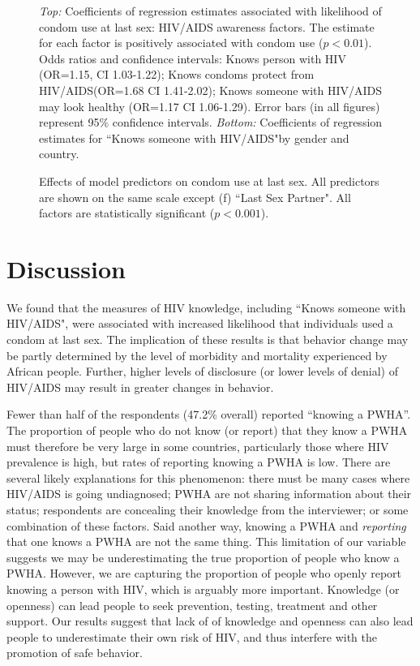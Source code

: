 \documentclass[10pt,letterpaper]{article}
\newcommand{\KnowsPWHA}{``Knows someone with HIV/AIDS"}
\begin{document}
\begin{figure}[!hbt]
\caption{\emph{Top:} Coefficients of regression estimates associated with likelihood of condom use at last sex: HIV/AIDS awareness factors. The estimate for each factor is positively associated with condom use ($p<0.01$). Odds ratios and confidence intervals: Knows person with HIV (OR=1.15, CI 1.03-1.22); Knows condoms protect from HIV/AIDS(OR=1.68 CI 1.41-2.02); Knows someone with HIV/AIDS may look healthy (OR=1.17 CI 1.06-1.29). Error bars (in all figures) represent 95\% confidence intervals. \emph{Bottom:} Coefficients of regression estimates for \KnowsPWHA by gender and country.
}
\label{combined_coefplot.fig}
\end{figure}
%
%
\begin{figure}[!hbt]
\caption{Effects of model predictors on condom use at last sex. All predictors are shown on the same scale except (f) ``Last Sex Partner". All factors are statistically significant ($p <0.001$).}
\label{panel_plot.fig}
\end{figure}


\section{Discussion}

We found that the measures of HIV knowledge, including \KnowsPWHA, were associated with increased likelihood that individuals used a condom at last sex.  The implication of these results is that behavior change may be partly determined by the level of morbidity and mortality experienced by African people. Further, higher levels of disclosure (or lower levels of denial) of HIV/AIDS may result in greater changes in behavior.

Fewer than half of the respondents (47.2\% overall) reported ``knowing a PWHA''. The proportion of people who do not know (or report) that they know a PWHA must therefore be very large in some countries, particularly those where HIV prevalence is high, but rates of reporting knowing a PWHA is low. There are several likely explanations for this phenomenon: there must be many cases where HIV/AIDS is going undiagnosed; PWHA are not sharing information about their status; respondents are concealing their knowledge from the interviewer; or some combination of these factors.  Said another way, knowing a PWHA and \emph{reporting} that one knows a PWHA are not the same thing. This limitation of our variable suggests we may be underestimating the true proportion of people who know a PWHA. However, we are capturing the proportion of people who openly report knowing a person with HIV, which is arguably more important. Knowledge (or openness) can lead people to seek prevention,  testing, treatment and other support.  Our results suggest that lack of of knowledge and openness can also lead people to underestimate their own risk of HIV, and thus interfere with the promotion of safe behavior.
\end{document}
